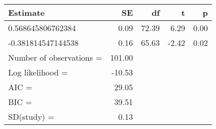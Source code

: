 \begin{table}[ht]
\centering
\begin{tabular}{lrrrr}
  \hline
Estimate & SE & df & t & p \\ 
  \hline
0.568645806762384 & 0.09 & 72.39 & 6.29 & 0.00 \\ 
  -0.381814547144538 & 0.16 & 65.63 & -2.42 & 0.02 \\ 
  Number of observations = & 101.00 &  &  &  \\ 
  Log likelihood = & -10.53 &  &  &  \\ 
  AIC = & 29.05 &  &  &  \\ 
  BIC = & 39.51 &  &  &  \\ 
  SD(study) = & 0.13 &  &  &  \\ 
   \hline
\end{tabular}
\end{table}
